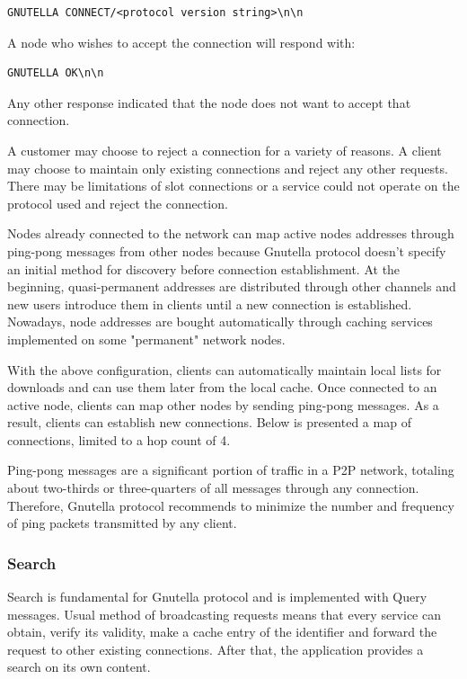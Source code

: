 \begin{verbatim}
GNUTELLA CONNECT/<protocol version string>\n\n
\end{verbatim}

A node who wishes to accept the connection will respond with:
\begin{verbatim}
GNUTELLA OK\n\n
\end{verbatim}

Any other response indicated that the node does not want to accept that
connection.

A customer may choose to reject a connection for a variety of reasons. A client
may choose to maintain only existing connections and reject any other requests.
There may be limitations of slot connections or a service could not operate on
the protocol used and reject the connection.

Nodes already connected to the network can map active nodes addresses through
ping-pong messages from other nodes because Gnutella protocol doesn't specify
an initial method for discovery before connection establishment. At the
beginning, quasi-permanent addresses are distributed through other channels
and new users introduce them in clients until a new connection is established.
Nowadays, node addresses are bought automatically through caching services
implemented on some "permanent" network nodes.

With the above configuration, clients can automatically maintain local lists
for downloads and can use them later from the local cache. Once connected to an
active node, clients can map other nodes by sending ping-pong messages. As a
result, clients can establish new connections. Below is presented a map of
connections, limited to a hop count of 4.

Ping-pong messages are a significant portion of traffic in a P2P network,
totaling about two-thirds or three-quarters of all messages through any
connection. Therefore, Gnutella protocol recommends to minimize the number
and frequency of ping packets transmitted by any client.

\subsubsection{Search}

Search is fundamental for Gnutella protocol and is implemented with Query
messages. Usual method of broadcasting requests means that every service
can obtain, verify its validity, make a cache entry of the identifier and
forward the request to other existing connections. After that, the application
provides a search on its own content.

